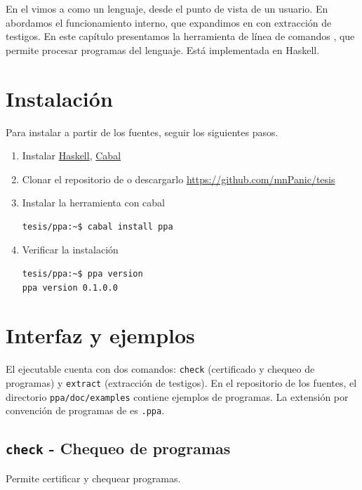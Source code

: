 En el  vimos a \ppaLang{} como un lenguaje, desde el punto de
vista de un usuario. En  abordamos el funcionamiento
interno, que expandimos en  con extracción de
testigos. En este capítulo presentamos la herramienta de línea de comandos
\ppaTool{}, que permite procesar programas del lenguaje. Está implementada en Haskell.

\section{Instalación}

Para instalar \ppaTool{} a partir de los fuentes, seguir los siguientes pasos.

\begin{enumerate}
    \item Instalar \href{https://www.haskell.org/}{Haskell}, \href{https://www.haskell.org/cabal/}{Cabal}
    \item Clonar el repositorio de \ppaTool{} o descargarlo \url{https://github.com/mnPanic/tesis}
    \item Instalar la herramienta con cabal
    \begin{verbatim}
tesis/ppa:~$ cabal install ppa
    \end{verbatim}
    \item Verificar la instalación
    \begin{verbatim}
tesis/ppa:~$ ppa version
ppa version 0.1.0.0
    \end{verbatim}
\end{enumerate}

\section{Interfaz y ejemplos}

El ejecutable \ppaTool{} cuenta con dos comandos: \texttt{check} (certificado y
chequeo de programas) y \texttt{extract} (extracción de testigos). En el
repositorio de los fuentes, el directorio \texttt{ppa/doc/examples} contiene
ejemplos de programas. La extensión por convención de programas de \ppaTool{} es \texttt{.ppa}.

\subsection{\texttt{check} - Chequeo de programas}

Permite certificar y chequear programas.

